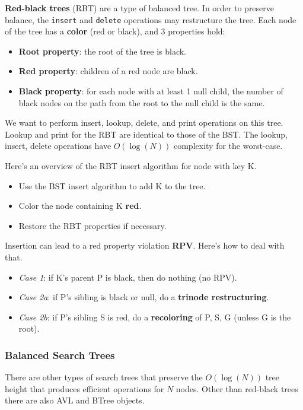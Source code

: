 \textbf{Red-black trees} (RBT) are a type of balanced tree. In order to preserve balance, the \texttt{insert} and \texttt{delete} operations may restructure the tree. Each node of the tree has a \textbf{color} (red or black), and 3 properties hold:

\begin{itemize}
	\item \textbf{Root property}: the root of the tree is black.
	\item \textbf{Red property}: children of a red node are black. 
	\item \textbf{Black property}: for each node with at least 1 null child, the number of black nodes on the path from the root to the null child is the same. 
\end{itemize}

We want to perform insert, lookup, delete, and print operations on this tree. Lookup and print for the RBT are identical to those of the BST. The lookup, insert, delete operations have $O(\log(N))$ complexity for the worst-case. 

Here's an overview of the RBT insert algorithm for node with key K. 

\begin{itemize}
	\item Use the BST insert algorithm to add K to the tree.
	\item Color the node containing K \textbf{red}.
	\item Restore the RBT properties if necessary.
\end{itemize}

Insertion can lead to a red property violation \textbf{RPV}. Here's how to deal with that. 

\begin{itemize}
	\item \textit{Case 1}: if K's parent P is black, then do nothing (no RPV). 
	\item \textit{Case 2a}: if P's sibling is black or null, do a \textbf{trinode restructuring}. 
	\item \textit{Case 2b}: if P's sibling S is red, do a \textbf{recoloring} of P, S, G (unless G is the root). 
\end{itemize}

\subsubsection{Balanced Search Trees}

There are other types of search trees that preserve the $O(\log(N))$ tree height that produces efficient operations for $N$ nodes. Other than red-black trees there are also AVL and BTree objects. 

